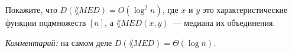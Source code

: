 Покажите, что $D(\lang{MED}) = O(\log^2 n)$, где $x$ и $y$ это характеристические функции подмножеств
$[n]$, а $\lang{MED}(x, y)$~--- медиана их объединения.

\textit{Комментарий:} на самом деле $D(\lang{MED}) = \Theta(\log n)$.